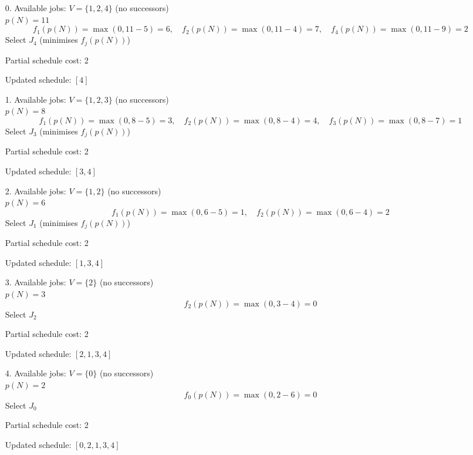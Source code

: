 \documentclass[fleqn]{article}
\begin{document}
    \begin{enumerate}
      \item[0.] Available jobs: $V = \{ 1, 2, 4 \}$ (no successors) \\
      $p(N) = 11$
      \[
      f_{1}(p(N)) = \max(0, 11 - 5) = 6, \quad f_{2}(p(N)) = \max(0, 11 - 4) = 7, \quad f_{4}(p(N)) = \max(0, 11 - 9) = 2
      \]    
      Select $J_{4}$ (minimises $f_j(p(N))$)

      Partial schedule cost: 2

      Updated schedule: $[4]$
        

      \item[1.] Available jobs: $V = \{ 1, 2, 3 \}$ (no successors) \\
      $p(N) = 8$
      \[
      f_{1}(p(N)) = \max(0, 8 - 5) = 3, \quad f_{2}(p(N)) = \max(0, 8 - 4) = 4, \quad f_{3}(p(N)) = \max(0, 8 - 7) = 1
      \]    
      Select $J_{3}$ (minimises $f_j(p(N))$)

      Partial schedule cost: 2

      Updated schedule: $[3, 4]$
        

      \item[2.] Available jobs: $V = \{ 1, 2 \}$ (no successors) \\
      $p(N) = 6$
      \[
      f_{1}(p(N)) = \max(0, 6 - 5) = 1, \quad f_{2}(p(N)) = \max(0, 6 - 4) = 2
      \]    
      Select $J_{1}$ (minimises $f_j(p(N))$)

      Partial schedule cost: 2

      Updated schedule: $[1, 3, 4]$
        

      \item[3.] Available jobs: $V = \{ 2 \}$ (no successors) \\
      $p(N) = 3$
      \[
      f_{2}(p(N)) = \max(0, 3 - 4) = 0
      \]    
      Select $J_{2}$

      Partial schedule cost: 2

      Updated schedule: $[2, 1, 3, 4]$
        

      \item[4.] Available jobs: $V = \{ 0 \}$ (no successors) \\
      $p(N) = 2$
      \[
      f_{0}(p(N)) = \max(0, 2 - 6) = 0
      \]    
      Select $J_{0}$

      Partial schedule cost: 2

      Updated schedule: $[0, 2, 1, 3, 4]$
    \end{enumerate}
    
\end{document}
